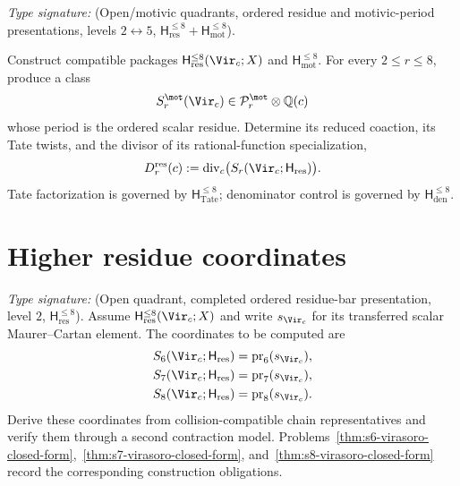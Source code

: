 \begin{problem}
\ClaimStatusOpen
\label{thm:part-ii-motivic-purity-virasoro-r-le-8}
\emph{Type signature:}
\textup{(Open/motivic quadrants, ordered residue and motivic-period
presentations, levels \(2\leftrightarrow5\),
\(\mathsf H_{\mathrm{res}}^{\le8}
+\mathsf H_{\mathrm{mot}}^{\le8}\)).}

Construct compatible packages
\(\mathsf H_{\mathrm{res}}^{\le8}(\Vir_c;X)\) and
\(\mathsf H_{\mathrm{mot}}^{\le8}\).  For every
\(2\le r\le8\), produce a class
\[
 S_r^{\mot}(\Vir_c)
 \in\mathcal P_r^{\mot}\otimes\mathbb Q(c)
\]
whose period is the ordered scalar residue.  Determine its reduced
coaction, its Tate twists, and the divisor of its rational-function
specialization,
\begin{equation}
 D_r^{\mathrm{res}}(c)
 :=\operatorname{div}_c
 \bigl(S_r(\Vir_c;\mathsf H_{\mathrm{res}})\bigr).
 \label{eq:part-ii-motivic-denominator}
\end{equation}
Tate factorization is governed by
\(\mathsf H_{\mathrm{Tate}}^{\le8}\); denominator control is governed
by \(\mathsf H_{\mathrm{den}}^{\le8}\).
\end{problem}

\section{Higher residue coordinates}
\label{sec:part-ii-higher-s-r}

\begin{problem}
\ClaimStatusOpen
\label{prop:part-ii-virasoro-shadow-through-r-8}
\emph{Type signature:}
\textup{(Open quadrant, completed ordered residue-bar presentation,
level \(2\), \(\mathsf H_{\mathrm{res}}^{\le8}\)).}
Assume \(\mathsf H_{\mathrm{res}}^{\le8}(\Vir_c;X)\) and write
\(s_{\Vir_c}\) for its transferred scalar Maurer--Cartan element.
The coordinates to be computed are
\begin{align}
 S_6(\Vir_c;\mathsf H_{\mathrm{res}})
 &=\operatorname{pr}_6(s_{\Vir_c}),
 \label{eq:s6-virasoro}\\
 S_7(\Vir_c;\mathsf H_{\mathrm{res}})
 &=\operatorname{pr}_7(s_{\Vir_c}),
 \label{eq:s7-virasoro}\\
 S_8(\Vir_c;\mathsf H_{\mathrm{res}})
 &=\operatorname{pr}_8(s_{\Vir_c}).
 \label{eq:s8-virasoro}
\end{align}
Derive these coordinates from collision-compatible chain
representatives and verify them through a second contraction model.
Problems~\ref{thm:s6-virasoro-closed-form},~\ref{thm:s7-virasoro-closed-form},
and~\ref{thm:s8-virasoro-closed-form} record the corresponding
construction obligations.
\end{problem}

